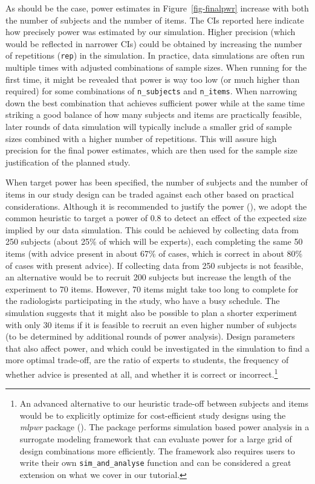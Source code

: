 \documentclass[
  man,
  floatsintext,
  longtable,
  a4paper,
  nolmodern,
  notxfonts,
  notimes,
  colorlinks=true,linkcolor=blue,citecolor=blue,urlcolor=blue]{apa7}
\begin{document}
As should be the case, power estimates in Figure~\ref{fig-finalpwr}
increase with both the number of subjects and the number of items. The
CIs reported here indicate how precisely power was estimated by our
simulation. Higher precision (which would be reflected in narrower CIs)
could be obtained by increasing the number of repetitions (\texttt{rep})
in the simulation. In practice, data simulations are often run multiple
times with adjusted combinations of sample sizes. When running for the
first time, it might be revealed that power is way too low (or much
higher than required) for some combinations of \texttt{n\_subjects} and
\texttt{n\_items}. When narrowing down the best combination that
achieves sufficient power while at the same time striking a good balance
of how many subjects and items are practically feasible, later rounds of
data simulation will typically include a smaller grid of sample sizes
combined with a higher number of repetitions. This will assure high
precision for the final power estimates, which are then used for the
sample size justification of the planned study.

When target power has been specified, the number of subjects and the
number of items in our study design can be traded against each other
based on practical considerations. Although it is recommended to justify
the power (), we adopt the common heuristic to target a power of 0.8 to
detect an effect of the expected size implied by our data simulation.
This could be achieved by collecting data from 250 subjects (about 25\%
of which will be experts), each completing the same 50 items (with
advice present in about 67\% of cases, which is correct in about 80\% of
cases with present advice). If collecting data from 250 subjects is not
feasible, an alternative would be to recruit 200 subjects but increase
the length of the experiment to 70 items. However, 70 items might take
too long to complete for the radiologists participating in the study,
who have a busy schedule. The simulation suggests that it might also be
possible to plan a shorter experiment with only 30 items if it is
feasible to recruit an even higher number of subjects (to be determined
by additional rounds of power analysis). Design parameters that also
affect power, and which could be investigated in the simulation to find
a more optimal trade-off, are the ratio of experts to students, the
frequency of whether advice is presented at all, and whether it is
correct or incorrect.\footnote{An advanced alternative to our heuristic
  trade-off between subjects and items would be to explicitly optimize
  for cost-efficient study designs using the \emph{mlpwr} package
  ().
  The package performs simulation based power analysis in a surrogate
  modeling framework that can evaluate power for a large grid of design
  combinations more efficiently. The framework also requires users to
  write their own \texttt{sim\_and\_analyse} function and can be
  considered a great extension on what we cover in our tutorial.}
\end{document}
